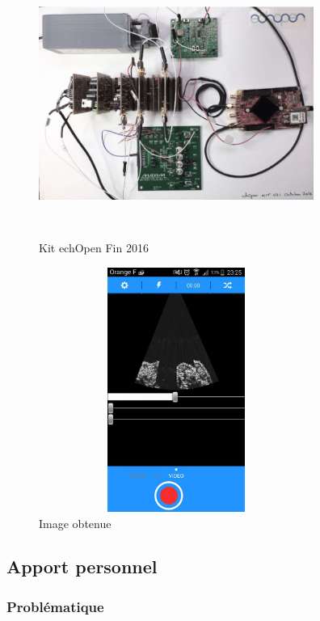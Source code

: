\documentclass[12pt]{article}
\begin{document}
\begin{figure}[!h]
  \hspace{-30pt}
  \vspace{30pt}
  \begin{minipage}[b]{0.45\linewidth}
   \centering
   \includegraphics[width=9cm,height=8cm]{Images_rapport/kit}  
   \caption{Kit echOpen Fin 2016}   
  \end{minipage}
\hfill
  \begin{minipage}[b]{0.45\linewidth}
   \centering
   \includegraphics[width=9cm,height=8cm]{Images_rapport/result}  
   \caption{Image obtenue}   
  \end{minipage}
\end{figure}

\newpage
\subsection{Apport personnel}
\subsubsection{Problématique}
\end{document}
